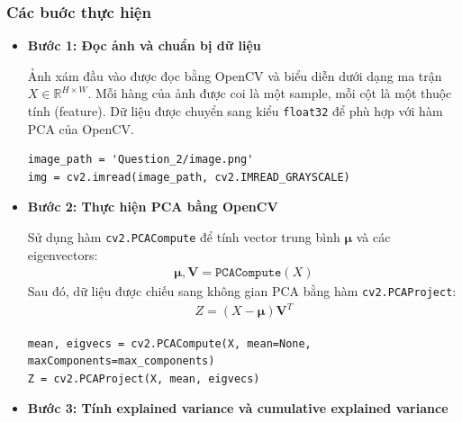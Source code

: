         \subsubsection{Các buớc thực hiện}
            \begin{itemize}
                \item \textbf{Bước 1: Đọc ảnh và chuẩn bị dữ liệu}

                    Ảnh xám đầu vào được đọc bằng OpenCV và biểu diễn dưới dạng ma trận $X \in \mathbb{R}^{H \times W}$. 
                    Mỗi hàng của ảnh được coi là một sample, mỗi cột là một thuộc tính (feature).
                    Dữ liệu được chuyển sang kiểu \texttt{float32} để phù hợp với hàm PCA của OpenCV.
                    \begin{lstlisting}
image_path = 'Question_2/image.png'
img = cv2.imread(image_path, cv2.IMREAD_GRAYSCALE)
                    \end{lstlisting}
                \item \textbf{Bước 2: Thực hiện PCA bằng OpenCV}

                    Sử dụng hàm \texttt{cv2.PCACompute} để tính vector trung bình $\boldsymbol{\mu}$ và các eigenvectors:
                    \begin{align}
                        \boldsymbol{\mu}, \mathbf{V} = \texttt{PCACompute}(X)
                    \end{align}
                    Sau đó, dữ liệu được chiếu sang không gian PCA bằng hàm \texttt{cv2.PCAProject}:
                    \begin{align}
                        Z = (X - \boldsymbol{\mu}) \mathbf{V}^T
                    \end{align}
                    \begin{lstlisting}
mean, eigvecs = cv2.PCACompute(X, mean=None, maxComponents=max_components)
Z = cv2.PCAProject(X, mean, eigvecs)
                    \end{lstlisting}

                \item \textbf{Bước 3: Tính explained variance và cumulative explained variance}


\end{itemize}
